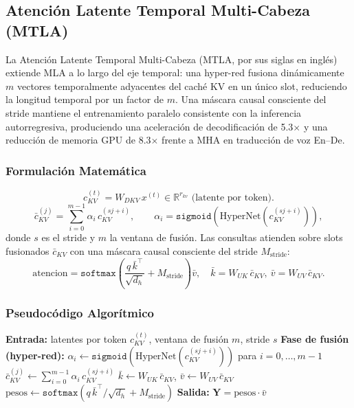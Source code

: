 \subsection{Atención Latente Temporal Multi-Cabeza (MTLA)}
La Atención Latente Temporal Multi-Cabeza (MTLA, por sus siglas en inglés) \citep{deng_mtla_2025} extiende MLA a lo largo del eje temporal: una hyper-red fusiona dinámicamente $m$ vectores temporalmente adyacentes del caché KV en un único slot, reduciendo la longitud temporal por un factor de $m$. Una máscara causal consciente del stride mantiene el entrenamiento paralelo consistente con la inferencia autorregresiva, produciendo una aceleración de decodificación de 5.3$\times$ y una reducción de memoria GPU de 8.3$\times$ frente a MHA en traducción de voz En--De.

\subsubsection{Formulación Matemática}
\[
c_{KV}^{(t)} = W_{DKV}\, x^{(t)} \in \mathbb{R}^{r_{kv}} \text{ (latente por token)}.
\]
\[
\bar c_{KV}^{(j)} = \sum_{i=0}^{m-1} \alpha_i\, c_{KV}^{(s j + i)}, \qquad \alpha_i = \texttt{sigmoid}(\text{HyperNet}(c_{KV}^{(s j + i)})),
\]
donde $s$ es el stride y $m$ la ventana de fusión. Las consultas atienden sobre slots fusionados $\bar c_{KV}$ con una máscara causal consciente del stride $M_{\text{stride}}$:
\[
\text{atencion} = \texttt{softmax}\!\left(\frac{q\, \bar k^\top}{\sqrt{d_h}} + M_{\text{stride}}\right) \bar v, \quad \bar k = W_{UK}\, \bar c_{KV},\ \bar v = W_{UV}\, \bar c_{KV}.
\]

\subsubsection{Pseudocódigo Algorítmico}
\begin{algorithmic}[1]
\State \textbf{Entrada:} latentes por token $c_{KV}^{(t)}$, ventana de fusión $m$, stride $s$
\State \textbf{Fase de fusión (hyper-red):}
    \State $\alpha_i \gets \texttt{sigmoid}(\text{HyperNet}(c_{KV}^{(s j + i)}))$ para $i = 0, \ldots, m-1$
    \State $\bar c_{KV}^{(j)} \gets \sum_{i=0}^{m-1} \alpha_i\, c_{KV}^{(s j + i)}$ 
\EndFor
\State $\bar k \gets W_{UK}\, \bar c_{KV}$, \quad $\bar v \gets W_{UV}\, \bar c_{KV}$
\State $\text{pesos} \gets \texttt{softmax}(q\, \bar k^\top / \sqrt{d_h} + M_{\text{stride}})$ 
\State \textbf{Salida:} $\mathbf{Y} = \text{pesos} \cdot \bar v$
\end{algorithmic}

